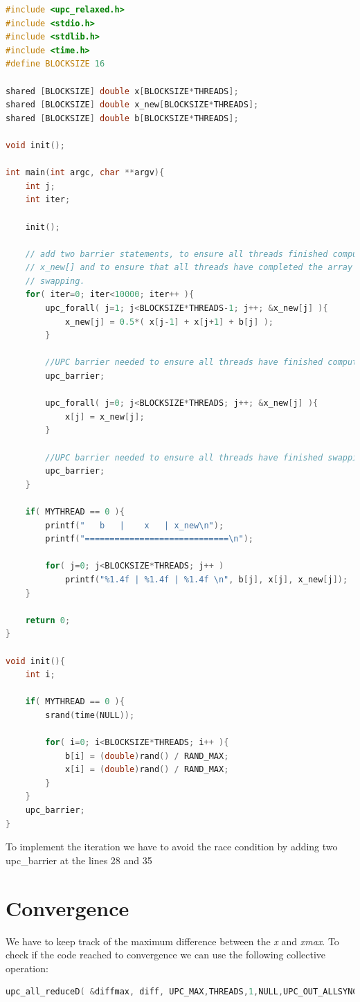 \documentclass{report}
\begin{document}
\begin{lstlisting}[language=c]
#include <upc_relaxed.h>
#include <stdio.h>
#include <stdlib.h>
#include <time.h>
#define BLOCKSIZE 16

shared [BLOCKSIZE] double x[BLOCKSIZE*THREADS];
shared [BLOCKSIZE] double x_new[BLOCKSIZE*THREADS];
shared [BLOCKSIZE] double b[BLOCKSIZE*THREADS];

void init();

int main(int argc, char **argv){
    int j;
    int iter;

    init();

    // add two barrier statements, to ensure all threads finished computing
    // x_new[] and to ensure that all threads have completed the array
    // swapping.
    for( iter=0; iter<10000; iter++ ){
        upc_forall( j=1; j<BLOCKSIZE*THREADS-1; j++; &x_new[j] ){
            x_new[j] = 0.5*( x[j-1] + x[j+1] + b[j] );
        }

        //UPC barrier needed to ensure all threads have finished computing x_new[]
        upc_barrier;

        upc_forall( j=0; j<BLOCKSIZE*THREADS; j++; &x_new[j] ){
            x[j] = x_new[j];
        }

        //UPC barrier needed to ensure all threads have finished swapping x[] and x_new[]
        upc_barrier;
    }

    if( MYTHREAD == 0 ){
        printf("   b   |    x   | x_new\n");
        printf("=============================\n");

        for( j=0; j<BLOCKSIZE*THREADS; j++ )
            printf("%1.4f | %1.4f | %1.4f \n", b[j], x[j], x_new[j]);
    }

    return 0;
}

void init(){
    int i;

    if( MYTHREAD == 0 ){
        srand(time(NULL));

        for( i=0; i<BLOCKSIZE*THREADS; i++ ){
            b[i] = (double)rand() / RAND_MAX;
            x[i] = (double)rand() / RAND_MAX;
        }
    }
    upc_barrier;
}

\end{lstlisting}

To implement the iteration we have to avoid the race condition by adding two upc\_barrier at the lines 28 and 35

\section{Convergence}
We have to keep track of the maximum difference between the \textit{x} and \textit{xmax}.
To check if the code reached to convergence we can use the following collective operation:
\begin{lstlisting}[language=c]
upc_all_reduceD( &diffmax, diff, UPC_MAX,THREADS,1,NULL,UPC_OUT_ALLSYNC);
\end{lstlisting}
\end{document}
